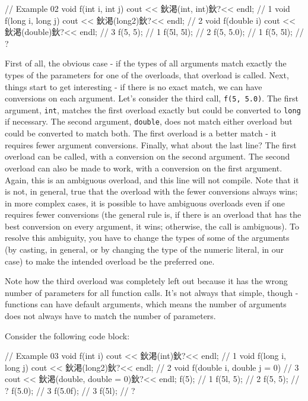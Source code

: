 \begin{code}
// Example 02
void f(int i, int j) { cout << 鈥渇(int, int)鈥?<< endl; }// 1
void f(long i, long j) { cout << 鈥渇(long2)鈥?<< endl; }    // 2
void f(double i) { cout << 鈥渇(double)鈥?<< endl; }      // 3
f(5, 5);    // 1
f(5l, 5l);    // 2
f(5, 5.0);    // 1
f(5, 5l);    // ?
\end{code}

First of all, the obvious case - if the types of all arguments match exactly the types of the parameters for one of the overloads, that overload is called. Next, things start to get interesting - if there is no exact match, we can have conversions on each argument. Let's consider the third call, \texttt{f(5,\ 5.0)}. The first argument, \texttt{int}, matches the first overload exactly but could be converted to \texttt{long} if necessary. The second argument, \texttt{double}, does not match either overload but could be converted to match both. The first overload is a better match - it requires fewer argument conversions. Finally, what about the last line? The first overload can be called, with a conversion on the second argument. The second overload can also be made to work, with a conversion on the first argument. Again, this is an ambiguous overload, and this line will not compile. Note that it is not, in general, true that the overload with the fewer conversions always wins; in more complex cases, it is possible to have ambiguous overloads even if one requires fewer conversions (the general rule is, if there is an overload that has the best conversion on every argument, it wins; otherwise, the call is ambiguous). To resolve this ambiguity, you have to change the types of some of the arguments (by casting, in general, or by changing the type of the numeric literal, in our case) to make the intended overload be the preferred one.

Note how the third overload was completely left out because it has the wrong number of parameters for all function calls. It's not always that simple, though - functions can have default arguments, which means the number of arguments does not always have to match the number of parameters.

Consider the following code block:

\begin{code}
// Example 03
void f(int i) { cout << 鈥渇(int)鈥?<< endl; }            // 1
void f(long i, long j) { cout << 鈥渇(long2)鈥?<< endl; }    // 2
void f(double i, double j = 0) {                    // 3
  cout << 鈥渇(double, double = 0)鈥?<< endl;
}
f(5);        // 1
f(5l, 5);    // 2
f(5, 5);    // ?
f(5.0);    // 3
f(5.0f);    // 3
f(5l);    // ?
\end{code}

